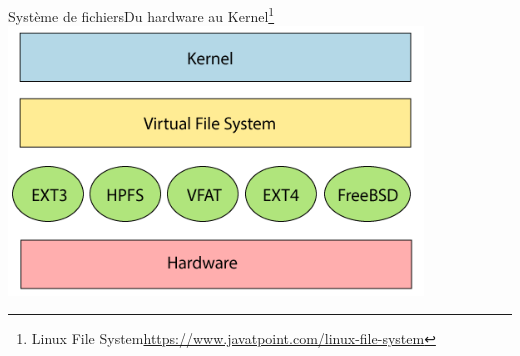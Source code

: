 \documentclass{beamer}
\begin{document}
    \begin{frame}{Système de fichiers}{Du hardware au Kernel\footnote{Linux File System\url{https://www.javatpoint.com/linux-file-system}}}
        \centering
        \includegraphics[width=11cm]{image/linux-file-system-stack}
    \end{frame}
\end{document}
